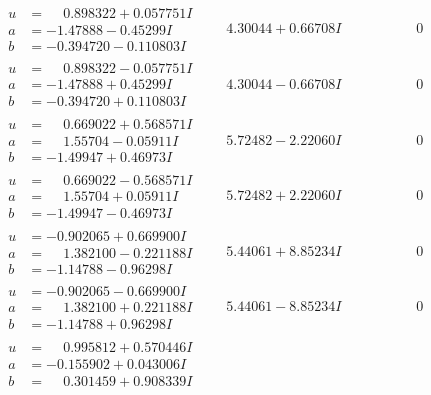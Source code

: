 \documentclass[1p]{elsarticle_modified}
\theoremstyle{definition}
\begin{document}
$$\begin{array}{c|c|c}
\begin{aligned}
u &= \phantom{-}0.898322 + 0.057751 I \\
a &= -1.47888 - 0.45299 I \\
b &= -0.394720 - 0.110803 I\end{aligned}
 & \phantom{-}4.30044 + 0.66708 I & \phantom{-0.000000 } 0 \\ \hline\begin{aligned}
u &= \phantom{-}0.898322 - 0.057751 I \\
a &= -1.47888 + 0.45299 I \\
b &= -0.394720 + 0.110803 I\end{aligned}
 & \phantom{-}4.30044 - 0.66708 I & \phantom{-0.000000 } 0 \\ \hline\begin{aligned}
u &= \phantom{-}0.669022 + 0.568571 I \\
a &= \phantom{-}1.55704 - 0.05911 I \\
b &= -1.49947 + 0.46973 I\end{aligned}
 & \phantom{-}5.72482 - 2.22060 I & \phantom{-0.000000 } 0 \\ \hline\begin{aligned}
u &= \phantom{-}0.669022 - 0.568571 I \\
a &= \phantom{-}1.55704 + 0.05911 I \\
b &= -1.49947 - 0.46973 I\end{aligned}
 & \phantom{-}5.72482 + 2.22060 I & \phantom{-0.000000 } 0 \\ \hline\begin{aligned}
u &= -0.902065 + 0.669900 I \\
a &= \phantom{-}1.382100 - 0.221188 I \\
b &= -1.14788 - 0.96298 I\end{aligned}
 & \phantom{-}5.44061 + 8.85234 I & \phantom{-0.000000 } 0 \\ \hline\begin{aligned}
u &= -0.902065 - 0.669900 I \\
a &= \phantom{-}1.382100 + 0.221188 I \\
b &= -1.14788 + 0.96298 I\end{aligned}
 & \phantom{-}5.44061 - 8.85234 I & \phantom{-0.000000 } 0 \\ \hline\begin{aligned}
u &= \phantom{-}0.995812 + 0.570446 I \\
a &= -0.155902 + 0.043006 I \\
b &= \phantom{-}0.301459 + 0.908339 I\end{aligned}

\end{array}$$
\end{document}
